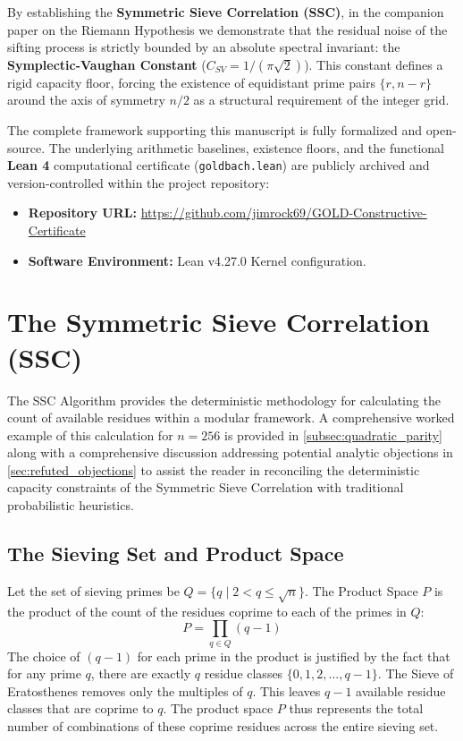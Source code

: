 \documentclass[sn-mathphys-num, pdflatex]{sn-jnl}
\begin{document}
By establishing the \textbf{Symmetric Sieve Correlation (SSC)}, in the companion paper on the Riemann Hypothesis \cite{Rock2026Repository} we demonstrate that the residual noise of the sifting process is strictly bounded by an absolute spectral invariant: the \textbf{Symplectic-Vaughan Constant} ($C_{SV} = 1/(\pi\sqrt{2})$). This constant defines a rigid capacity floor, forcing the existence of equidistant prime pairs $\{r, n-r\}$ around the axis of symmetry $n/2$ as a structural requirement of the integer grid.

The complete framework supporting this manuscript is fully formalized and open-source. The underlying arithmetic baselines, existence floors, and the functional \textbf{Lean 4} computational certificate (\texttt{goldbach.lean}) are publicly archived and version-controlled within the project repository:
\begin{itemize}
    \item \textbf{Repository URL:} \label{gitGold}\url{https://github.com/jimrock69/GOLD-Constructive-Certificate}
    \item \textbf{Software Environment:} Lean v4.27.0 Kernel configuration.
\end{itemize}
\section{The Symmetric Sieve Correlation (SSC)} 
\label{sec:ssc}

The SSC Algorithm provides the deterministic methodology for calculating the count of available residues within a modular framework. A comprehensive worked example of this calculation for $n=256$ is provided in \ref{subsec:quadratic_parity} along with a comprehensive discussion addressing potential analytic objections in \ref{sec:refuted_objections} to assist the reader in reconciling the deterministic capacity constraints of the Symmetric Sieve Correlation with traditional probabilistic heuristics.

\subsection{The Sieving Set and Product Space}
\label{subsec:sieving_set}

Let the set of sieving primes be $Q = \{q \mid 2 < q \le \sqrt{n}\}$. The Product Space $P$ is the product of the count of the residues coprime to each of the primes in $Q$:
\begin{equation}
P = \prod_{q \in Q} (q - 1)
\end{equation}
The choice of $(q-1)$ for each prime in the product is justified by the fact that for any prime $q$, there are exactly $q$ residue classes $\{0, 1, 2, \dots, q-1\}$. The Sieve of Eratosthenes removes only the multiples of $q$. This leaves $q-1$ available residue classes that are coprime to $q$. The product space $P$ thus represents the total number of combinations of these coprime residues across the entire sieving set.
\end{document}
